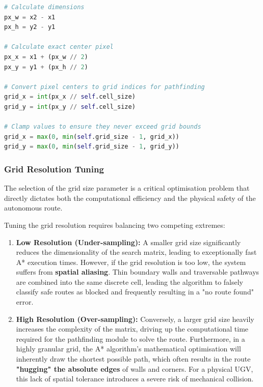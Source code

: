 \documentclass[12pt, a4paper]{article}
\begin{document}
\vspace{0.5cm}

\noindent\begin{minipage}{1\linewidth}
    \begin{lstlisting}[language=Python, caption=Translating visual bounding boxes into bounded discrete grid nodes, label=lst:spatial_discretisation]
# Calculate dimensions
px_w = x2 - x1
px_h = y2 - y1

# Calculate exact center pixel
px_x = x1 + (px_w // 2)
px_y = y1 + (px_h // 2)

# Convert pixel centers to grid indices for pathfinding
grid_x = int(px_x // self.cell_size)
grid_y = int(px_y // self.cell_size)

# Clamp values to ensure they never exceed grid bounds
grid_x = max(0, min(self.grid_size - 1, grid_x))
grid_y = max(0, min(self.grid_size - 1, grid_y))
    \end{lstlisting}
\end{minipage}

\vspace{0.5cm}

\subsubsection{Grid Resolution Tuning}

\quad The selection of the grid size parameter is a critical optimisation problem that directly dictates both the computational efficiency and the physical safety of the autonomous route.

\vspace{0.5cm}

\hspace{-1.5em}Tuning the grid resolution requires balancing two competing extremes:

\begin{enumerate}
  \item \textbf{Low Resolution (Under-sampling):} A smaller grid size significantly reduces the dimensionality of the search matrix, leading to exceptionally fast A* execution times. However, if the grid resolution is too low, the system suffers from \textbf{spatial aliasing}. Thin boundary walls and traversable pathways are combined into the same discrete cell, leading the algorithm to falsely classify safe routes as blocked and frequently resulting in a "no route found" error.
  
  \item \textbf{High Resolution (Over-sampling):} Conversely, a larger grid size heavily increases the complexity of the matrix, driving up the computational time required for the pathfinding module to solve the route. Furthermore, in a highly granular grid, the A* algorithm's mathematical optimisation will inherently draw the shortest possible path, which often results in the route \textbf{"hugging" the absolute edges} of walls and corners. For a physical UGV, this lack of spatial tolerance introduces a severe risk of mechanical collision.
\end{enumerate}
\end{document}
